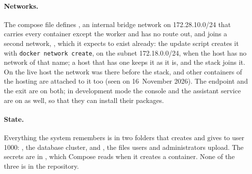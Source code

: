 \paragraph{Networks.} The compose file defines , an internal bridge network on
172.28.10.0/24 that carries every container except the worker and has no route out, and joins
a second network, , which it expects to exist already: the update script
creates it with \texttt{docker network create}, on the subnet 172.18.0.0/24, when the host has
no network of that name; a host that has one keeps it as it is, and the stack joins it. On the
live host the network was there before the stack, and other containers of the hosting are
attached to it too (seen on 16~November 2026). The endpoint and
the exit are on both; in development mode the console and the assistant service are on
 as well, so that they can install their packages.

\paragraph{State.} Everything the system remembers is in two folders that
 creates and gives to user 1000: , the
database cluster, and , the files users and administrators upload.
The secrets are in , which Compose reads when it creates a container. None of the
three is in the repository.

